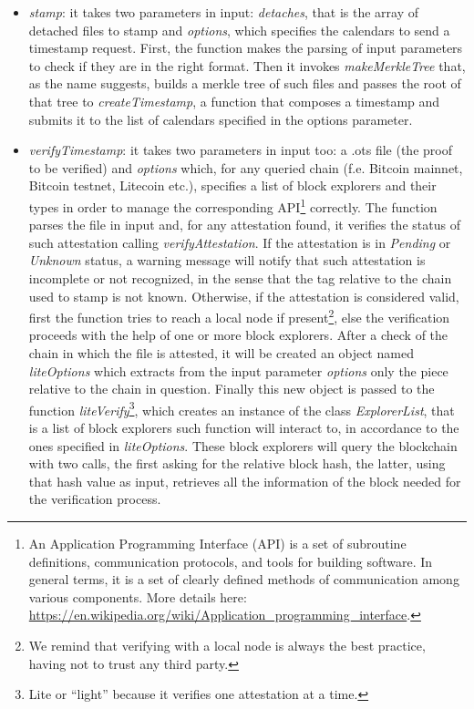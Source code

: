 \begin{itemize}
    \item \textit{stamp}: it takes two parameters in input: \textit{detaches}, that is the array of detached files to stamp and \textit{options}, which specifies the calendars to send a timestamp request. First, the function makes the parsing of input parameters to check if they are in the right format. Then it invokes \textit{makeMerkleTree} that, as the name suggests, builds a merkle tree of such files and passes the root of that tree to \textit{createTimestamp}, a function that composes a timestamp and submits it to the list of calendars specified in the options parameter.
    \item \textit{verifyTimestamp}: it takes two parameters in input too: a \colorbox{light-gray}{.ots} file (the proof to be verified) and \textit{options} which, for any queried chain (f.e. Bitcoin mainnet, Bitcoin testnet, Litecoin etc.), specifies a list of block explorers and their types in order to manage the corresponding API\footnote{An Application Programming Interface (API) is a set of subroutine definitions, communication protocols, and tools for building software. In general terms, it is a set of clearly defined methods of communication among various components. More details here: \url{https://en.wikipedia.org/wiki/Application_programming_interface}.} correctly. The function parses the file in input and, for any attestation found, it verifies the status of such attestation calling \textit{verifyAttestation}. If the attestation is in \textit{Pending} or \textit{Unknown} status, a warning message will notify that such attestation is incomplete or not recognized, in the sense that the tag relative to the chain used to stamp is not known. Otherwise, if the attestation is considered valid, first the function tries to reach a local node if present\footnote{We remind that verifying with a local node is always the best practice, having not to trust any third party.}, else the verification proceeds with the help of one or more block explorers. After a check of the chain in which the file is attested, it will be created an object named \textit{liteOptions} which extracts from the input parameter \textit{options} only the piece relative to the chain in question. Finally this new object is passed to the function \textit{liteVerify}\textup{\footnote{Lite or \enquote{light} because it verifies one attestation at a time.}}, which creates an instance of the class \textit{ExplorerList}, that is a list of block explorers such function will interact to, in accordance to the ones specified in \textit{liteOptions}. These block explorers will query the blockchain with two calls, the first asking for the relative block hash, the latter, using that hash value as input, retrieves all the information of the block needed for the verification process.

\end{itemize}
